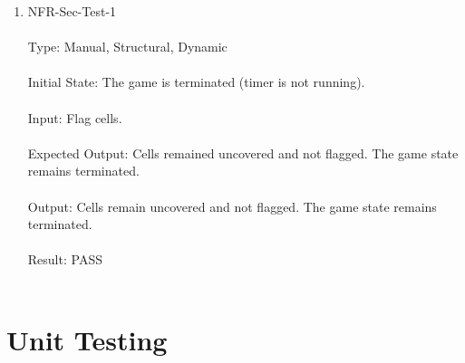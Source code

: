 \documentclass[12pt, titlepage]{article}
\begin{document}
\begin{enumerate}
\newpage
\item{NFR-Sec-Test-1\\\\}
Type: Manual, Structural, Dynamic\\\\				
Initial State: The game is terminated (timer is not running).\\\\
Input: Flag cells.\\\\					
Expected Output: Cells remained uncovered and not flagged. The game state remains terminated. \\\\
Output: Cells remain uncovered and not flagged. The game state remains terminated. \\\\
Result: PASS\\\\

\end{enumerate}

\newpage
\section{Unit Testing}
\end{document}
